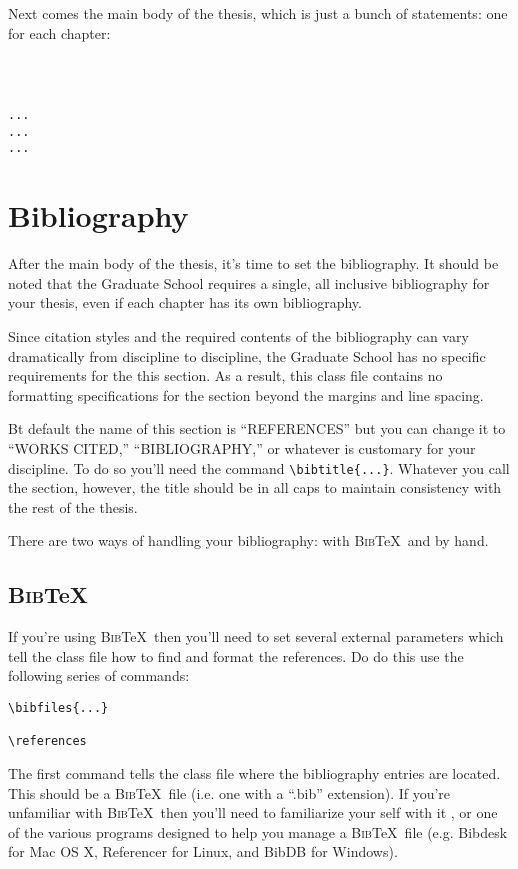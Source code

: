 \begin{verbatim}

\end{verbatim}

Next comes the main body of the thesis, which is just a bunch of \verb== statements: one for each chapter:

\begin{verbatim}



...
...
...
\end{verbatim}

\section{Bibliography}\label{bib}
After the main body of the thesis, it's time to set the bibliography.  It should be noted that the Graduate School requires a single, all inclusive bibliography for your thesis, even if each chapter has its own bibliography.

Since citation styles and the required contents of the bibliography can vary dramatically from discipline to discipline, the Graduate School has no specific requirements for the this section.  As a result, this class file contains no formatting specifications for the section beyond the margins and line spacing.

Bt default the name of this section is ``REFERENCES'' but you can change it to ``WORKS CITED,'' ``BIBLIOGRAPHY,'' or whatever is customary for your discipline.  To do so you'll need the command \verb=\bibtitle{...}=.  Whatever you call the section, however, the title should be in all caps to maintain consistency with the rest of the thesis.

There are two ways of handling your bibliography: with \textsc{Bib}\TeX\ and by hand.

\subsection{\textsc{Bib}\TeX}
If you're using \textsc{Bib}\TeX\ then you'll need to set several external parameters which tell the class file how to find and format the references.  Do do this use the following series of commands:

\begin{verbatim}
\bibfiles{...}

\references
\end{verbatim}

The first command tells the class file where the bibliography entries are located.  This should be a \textsc{Bib}\TeX\ file (i.e. one with a ``.bib'' extension).  If you're unfamiliar with \textsc{Bib}\TeX\ then you'll need to familiarize your self with it \citep{Feder:2006}, or one of the various programs designed to help you manage a \textsc{Bib}\TeX\ file (e.g. Bibdesk \citep{BibDesk} for Mac OS X, Referencer \citep{Spray:2007} for Linux, and BibDB \citep{Doron:1999} for Windows).

